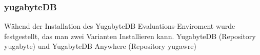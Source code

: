
\begin{flushleft}
    \subsubsection{yugabyteDB}
    Wähend der Installation des YugabyteDB Evaluations-Enviroment wurde festgestellt, das man zwei Varianten Installieren kann.
    YugabyteDB (Repository yugabyte) und YugabyteDB Anywhere (Repository yugawre)
\end{flushleft}